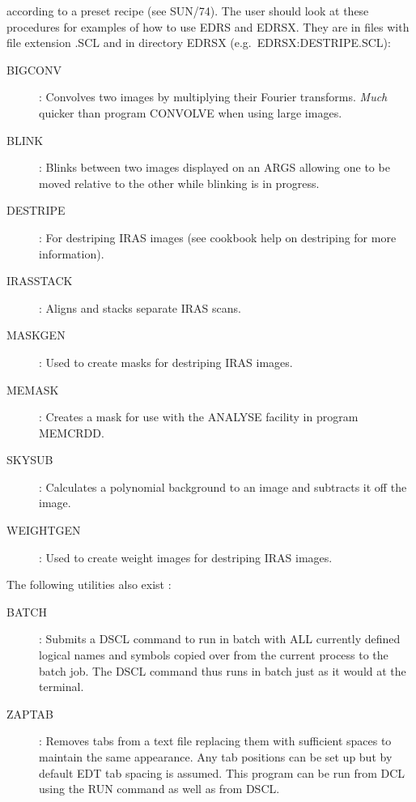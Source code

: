 according to a preset recipe (see SUN/74).
The user should look at these procedures for examples of how to use EDRS and
EDRSX.
They are in files with file extension .SCL and in directory EDRSX (e.g.\
EDRSX:DESTRIPE.SCL):
\begin{description}
\begin{description}
\item [BIGCONV]: Convolves two images by multiplying their Fourier transforms.
{\em Much} quicker than program CONVOLVE when using large images.
\item [BLINK]: Blinks between two images displayed on an ARGS allowing one to
be moved relative to the other while blinking is in progress.
\item [DESTRIPE]: For destriping IRAS images (see cookbook help on destriping
for more information).
\item [IRASSTACK]: Aligns and stacks separate IRAS scans.
\item [MASKGEN]: Used to create masks for destriping IRAS images.
\item [MEMASK]: Creates a mask for use with the ANALYSE facility in program 
MEMCRDD.
\item [SKYSUB]: Calculates a polynomial background to an image and subtracts
it off the image.
\item [WEIGHTGEN]: Used to create weight images for destriping IRAS images.
\end{description}
\end{description}
The following utilities also exist :
\begin{description}
\begin{description}
\item[BATCH]: Submits a DSCL command to run in batch with ALL currently defined
logical names and symbols copied over from the current process to the batch job.
The DSCL command thus runs in batch just as it would at the terminal.
\item[ZAPTAB]: Removes tabs from a text file replacing them with sufficient
spaces to maintain the same appearance.
Any tab positions can be set up but by default EDT tab spacing is assumed.
This program can be run from DCL using the RUN command as well as from DSCL.
\end{description}
\end{description}
